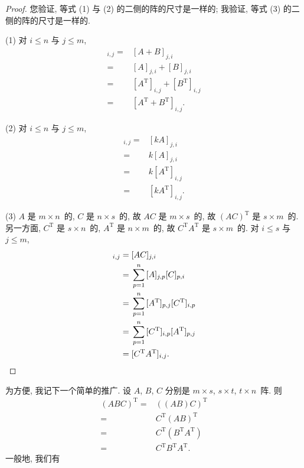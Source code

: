 \begin{proof}
    您验证, 等式 (1) 与 (2) 的二侧的阵的尺寸是一样的;
    我验证, 等式 (3) 的二侧的阵的尺寸是一样的.

    (1)
    对 \(i \leq n\) 与 \(j \leq m\),
    \begin{align*}
        [(A + B)^{\mathrm{T}}]_{i,j}
        = {} &
        [A + B]_{j,i}
        \\
        = {} &
        [A]_{j,i} + [B]_{j,i}
        \\
        = {} &
        [A^{\mathrm{T}}]_{i,j} + [B^{\mathrm{T}}]_{i,j}
        \\
        = {} &
        [A^{\mathrm{T}} + B^{\mathrm{T}}]_{i,j}.
    \end{align*}

    (2)
    对 \(i \leq n\) 与 \(j \leq m\),
    \begin{align*}
        [(k A)^{\mathrm{T}}]_{i,j}
        = {} &
        [k A]_{j,i}
        \\
        = {} &
        k [A]_{j,i}
        \\
        = {} &
        k [A^{\mathrm{T}}]_{i,j}
        \\
        = {} &
        [k A^{\mathrm{T}}]_{i,j}.
    \end{align*}

    (3)
    \(A\) 是 \(m \times n\)~的, \(C\) 是 \(n \times s\)~的,
    故 \(AC\) 是 \(m \times s\)~的,
    故 \((AC)^{\mathrm{T}}\) 是 \(s \times m\)~的.
    另一方面, \(C^{\mathrm{T}}\) 是 \(s \times n\)~的,
    \(A^{\mathrm{T}}\) 是 \(n \times m\)~的,
    故 \(C^{\mathrm{T}} A^{\mathrm{T}}\) 是 \(s \times m\)~的.
    对 \(i \leq s\) 与 \(j \leq m\),
    \begin{align*}
        [(AC)^{\mathrm{T}}]_{i,j}
        = {} &
        [AC]_{j,i}
        \\
        = {} &
        \sum_{p=1}^{n} {[A]_{j,p} [C]_{p,i}}
        \\
        = {} &
        \sum_{p=1}^{n}
        {[A^{\mathrm{T}}]_{p,j} [C^{\mathrm{T}}]_{i,p}}
        \\
        = {} &
        \sum_{p=1}^{n}
        {[C^{\mathrm{T}}]_{i,p} [A^{\mathrm{T}}]_{p,j}}
        \\
        = {} &
        [C^{\mathrm{T}} A^{\mathrm{T}}]_{i,j}.
        \qedhere
    \end{align*}
\end{proof}

为方便, 我记下一个简单的推广.
设 \(A\), \(B\), \(C\) 分别是
\(m \times s\), \(s \times t\), \(t \times n\)~阵.
则
\begin{align*}
    (ABC)^{\mathrm{T}}
    = {} &
    ((AB) C)^{\mathrm{T}}
    \\
    = {} &
    C^{\mathrm{T}}
    (AB)^{\mathrm{T}}
    \\
    = {} &
    C^{\mathrm{T}}
    (B^{\mathrm{T}} A^{\mathrm{T}})
    \\
    = {} &
    C^{\mathrm{T}}
    B^{\mathrm{T}}
    A^{\mathrm{T}}.
\end{align*}
一般地, 我们有

